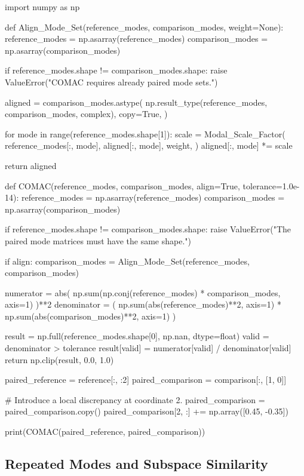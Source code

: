 \begin{python}
import numpy as np


def Align_Mode_Set(reference_modes, comparison_modes, weight=None):
    reference_modes = np.asarray(reference_modes)
    comparison_modes = np.asarray(comparison_modes)

    if reference_modes.shape != comparison_modes.shape:
        raise ValueError("COMAC requires already paired mode sets.")

    aligned = comparison_modes.astype(
        np.result_type(reference_modes, comparison_modes, complex),
        copy=True,
    )

    for mode in range(reference_modes.shape[1]):
        scale = Modal_Scale_Factor(
            reference_modes[:, mode],
            aligned[:, mode],
            weight,
        )
        aligned[:, mode] *= scale

    return aligned


def COMAC(reference_modes, comparison_modes, align=True,
          tolerance=1.0e-14):
    reference_modes = np.asarray(reference_modes)
    comparison_modes = np.asarray(comparison_modes)

    if reference_modes.shape != comparison_modes.shape:
        raise ValueError("The paired mode matrices must have the same shape.")

    if align:
        comparison_modes = Align_Mode_Set(reference_modes, comparison_modes)

    numerator = abs(
        np.sum(np.conj(reference_modes) * comparison_modes, axis=1)
    )**2
    denominator = (
        np.sum(abs(reference_modes)**2, axis=1)
        * np.sum(abs(comparison_modes)**2, axis=1)
    )

    result = np.full(reference_modes.shape[0], np.nan, dtype=float)
    valid = denominator > tolerance
    result[valid] = numerator[valid] / denominator[valid]
    return np.clip(result, 0.0, 1.0)


paired_reference = reference[:, :2]
paired_comparison = comparison[:, [1, 0]]

# Introduce a local discrepancy at coordinate 2.
paired_comparison = paired_comparison.copy()
paired_comparison[2, :] += np.array([0.45, -0.35])

print(COMAC(paired_reference, paired_comparison))
\end{python}

\subsection{Repeated Modes and Subspace Similarity}

